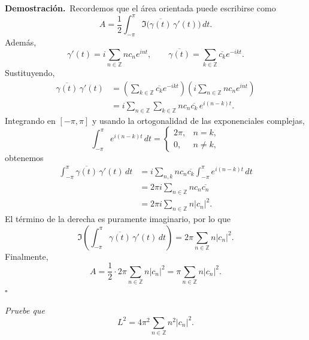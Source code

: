 \documentclass[11pt,letterpaper]{article}
\newcommand{\Z}{\mathbb{Z}}
\newcommand{\dt}{\,dt}
\begin{document}
\textbf{Demostración.}\,
Recordemos que el área orientada puede escribirse como
\begin{equation*}
    A=\frac12\int_{-\pi}^{\pi}\Im\bigl(\overline{\gamma(t)}\,\gamma'(t)\bigr)\dt.
\end{equation*}
Además,
\begin{equation*}
    \gamma'(t)=i\sum_{n\in\Z}nc_ne^{int},
    \qquad
    \overline{\gamma(t)}=\sum_{k\in\Z}\overline{c_k}e^{-ikt}.
\end{equation*}
Sustituyendo,
\begin{align*}
    \overline{\gamma(t)}\,\gamma'(t)
    &=\left(\sum_{k\in\Z}\overline{c_k}e^{-ikt}\right)
      \left(i\sum_{n\in\Z}nc_ne^{int}\right) \\
    &=i\sum_{n\in\Z}\sum_{k\in\Z}n c_n\overline{c_k}\,e^{i(n-k)t}.
\end{align*}
Integrando en $[-\pi,\pi]$ y usando la ortogonalidad de las exponenciales complejas,
\begin{equation*}
    \int_{-\pi}^{\pi}e^{i(n-k)t}\dt=
    \begin{cases}
        2\pi, & n=k,\\
        0, & n\neq k,
    \end{cases}
\end{equation*}
obtenemos
\begin{align*}
    \int_{-\pi}^{\pi}\overline{\gamma(t)}\,\gamma'(t)\dt
    &=i\sum_{n,k}n c_n\overline{c_k}\int_{-\pi}^{\pi}e^{i(n-k)t}\dt \\
    &=2\pi i\sum_{n\in\Z}n c_n\overline{c_n} \\
    &=2\pi i\sum_{n\in\Z}n|c_n|^2.
\end{align*}
El término de la derecha es puramente imaginario, por lo que
\begin{equation*}
    \Im\left(\int_{-\pi}^{\pi}\overline{\gamma(t)}\,\gamma'(t)\dt\right)
    =2\pi\sum_{n\in\Z}n|c_n|^2.
\end{equation*}
Finalmente,
\begin{equation*}
    A=\frac12\cdot 2\pi\sum_{n\in\Z}n|c_n|^2
    =\pi\sum_{n\in\Z}n|c_n|^2.
\end{equation*}
\hfill $\square$

\newpage

\begin{tcolorbox}[title=\textcolor{white}{Problema 15}]
\textit{Pruebe que}
\begin{equation*}
    L^2=4\pi^2\sum_{n\in\Z}n^2|c_n|^2.
\end{equation*}
\end{tcolorbox}
\end{document}
